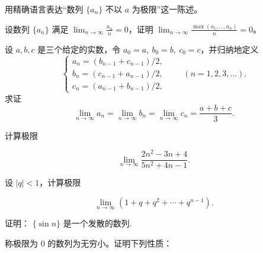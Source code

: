 \noindent\begin{minipage}{\textwidth}
用精确语言表达“数列 $\{a_n\}$ 不以 $a$ 为极限”这一陈述。
\end{minipage}\par\vfill
\newpage
\noindent\begin{minipage}{\textwidth}
设数列 $\{a_n\}$ 满足 $\displaystyle\lim_{n\to\infty}\frac{a_n}{n}=0$，证明 $\displaystyle\lim_{n\to\infty}\frac{\max(a_1,\ldots,a_n)}{n}=0$。
\end{minipage}\par\vfill
\newpage
\noindent\begin{minipage}{\textwidth}
设 $a,b,c$ 是三个给定的实数，令 $a_0=a,\ b_0=b,\ c_0=c$，并归纳地定义\[\begin{cases}a_n=(b_{n-1}+c_{n-1})/2,\\b_n=(c_{n-1}+a_{n-1})/2,\\c_n=(a_{n-1}+b_{n-1})/2,\end{cases}\qquad(n=1,2,3,\ldots).\]求证\[\lim_{n\to\infty}a_n=\lim_{n\to\infty}b_n=\lim_{n\to\infty}c_n=\frac{a+b+c}{3}.\]
\end{minipage}\par\vfill
\newpage
\noindent\begin{minipage}{\textwidth}
计算极限

\[\lim_{n\to\infty}\frac{2n^{2}-3n+4}{5n^{2}+4n-1}.\]
\end{minipage}\par\vfill
\noindent\begin{minipage}{\textwidth}
设 $ \left|q\right|<1 $，计算极限

\[\lim_{n\to\infty}(1+q+q^{2}+\cdots+q^{n-1}).\]
\end{minipage}\par\vfill
\noindent\begin{minipage}{\textwidth}
证明： $ \{\sin n\} $ 是一个发散的数列.
\end{minipage}\par\vfill
\newpage
\noindent\begin{minipage}{\textwidth}
称极限为 $0$ 的数列为无穷小。证明下列性质：
\end{minipage}\par\vfill
